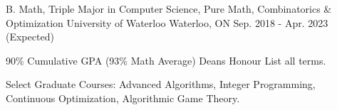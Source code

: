 

\begin{cventries}

  \cventry
    {B. Math, Triple Major in Computer Science, Pure Math, Combinatorics \& Optimization} %
    {University of Waterloo} %
    {Waterloo, ON} %
    {Sep. 2018 - Apr. 2023 (Expected)} %
    {
      \begin{cvitems} %
      \item {90\% Cumulative GPA (93\% Math Average) Deans Honour List all terms.}
      \item {Select Graduate Courses: Advanced Algorithms, Integer Programming, Continuous Optimization, Algorithmic Game Theory.}
      \end{cvitems}
    }

\end{cventries}
